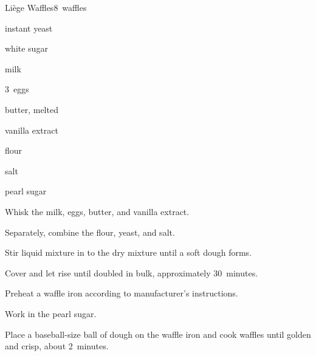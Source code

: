 \begin{recipe}{Li\`ege Waffles}{}{8~waffles}

\begin{ingredients}
\item {} instant yeast
\item \Tp{1\half} white sugar
\item \C{\threequarter} milk
\item 3~eggs
\item {} butter, melted
\item {} vanilla extract
\item {} flour
\item \tp{\half} salt
\item \C{1\half} pearl sugar
\end{ingredients}

\begin{directions}
\item Whisk the milk, eggs, butter, and vanilla extract.
\item Separately, combine the flour, yeast, and salt.
\item Stir liquid mixture in to the dry mixture until a soft dough forms.
\item Cover and let rise until doubled in bulk, approximately 30~minutes.
\item Preheat a waffle iron according to manufacturer's instructions.
\item Work in the pearl sugar.
\item Place a baseball-size ball of dough on the waffle iron and cook waffles until golden and crisp, about 2~minutes.
\end{directions}

\end{recipe}
